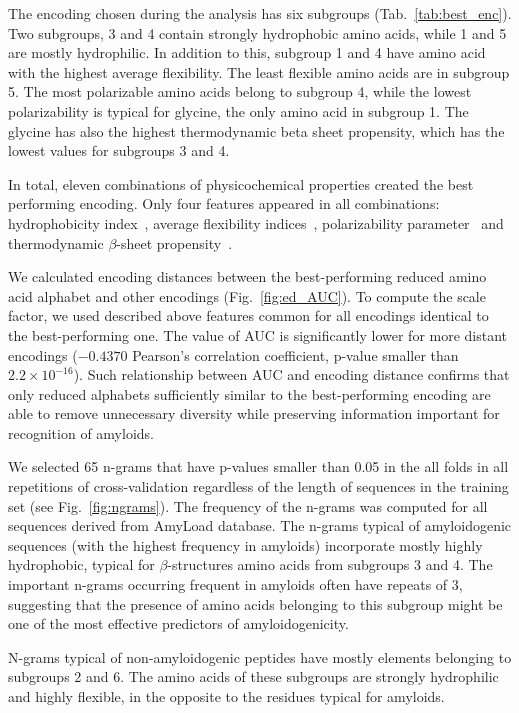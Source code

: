 \documentclass[a4,center,fleqn]{NAR}
\begin{document}
The encoding chosen during the analysis has six subgroups 
(Tab.~\ref{tab:best_enc}). Two subgroups, 3 and 4 contain strongly hydrophobic 
amino acids, while 1 and 5 are mostly hydrophilic. In addition to this, subgroup 
1 and 4 have amino acid with the highest average flexibility. The least flexible 
amino acids are in subgroup 5. The most polarizable amino acids belong to 
subgroup 4, while the lowest polarizability is typical for glycine, the only 
amino acid in subgroup 1. The glycine has also the highest thermodynamic beta 
sheet propensity, which has the lowest values for subgroups 3 and 4.

  In total, eleven combinations of physicochemical properties created the best 
performing encoding. Only four features appeared in all 
combinations: hydrophobicity index~\citep{argos_structural_1982}, average 
flexibility indices~\citep{bhaskaran_positional_1988}, polarizability 
parameter~\citep{charton_structural_1982} and thermodynamic $\beta$-sheet 
propensity~\citep{kim_thermodynamic_1993}.

  We calculated encoding distances between the best-performing reduced amino 
acid alphabet and other encodings (Fig.~\ref{fig:ed_AUC}). To compute the scale 
factor, we used described above features common for all encodings identical to 
the best-performing one. The value of AUC is significantly lower for more
distant encodings ($-0.4370$ Pearson's correlation coefficient, p-value smaller 
than $2.2 \times 10^{-16}$). Such relationship between AUC and encoding distance 
confirms that only reduced alphabets sufficiently similar to the best-performing 
encoding are able to remove unnecessary diversity while preserving information 
important for recognition of amyloids.

  We selected 65 n-grams that have p-values smaller than 0.05 in the all folds 
in all repetitions of cross-validation regardless of the length of sequences in 
the training set (see Fig.~\ref{fig:ngrams}). The frequency of the n-grams was 
computed for all sequences derived from AmyLoad database. The n-grams typical of 
amyloidogenic sequences (with the highest frequency in amyloids) incorporate 
mostly highly hydrophobic, typical for $\beta$-structures amino acids from 
subgroups 3 and 4. The important n-grams occurring frequent in amyloids often 
have repeats of 3, suggesting that the presence of amino acids belonging to this 
subgroup might be one of the most effective predictors of amyloidogenicity.

  N-grams typical of non-amyloidogenic peptides have mostly elements 
belonging to subgroups 2 and 6. The amino acids of these subgroups are strongly 
hydrophilic and highly flexible, in the opposite to the residues typical for 
amyloids.
\end{document}
